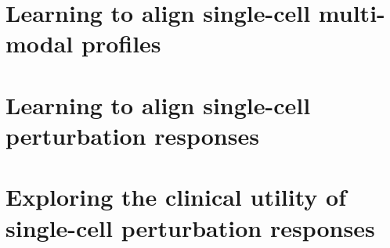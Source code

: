 \documentclass[12pt,a4paper,twoside,english,final]{ETHthesis}
\begin{document}
\section{Learning to align single-cell multi-modal profiles}

\cleardoublepageempty{}

\section{Learning to align single-cell perturbation responses}

\cleardoublepageempty{}

\section{Exploring the clinical utility of single-cell perturbation responses}

\cleardoublepageempty{}


\listoftables{}
\cleardoublepageempty{}
{}
\listoffigures{}
\cleardoublepageempty{}
\cleardoublepageempty{}


\let\l\relax
{}
\printbibliography{}
\cleardoublepageempty{}
\clearpage
\cleardoublepageempty{}
\end{document}
